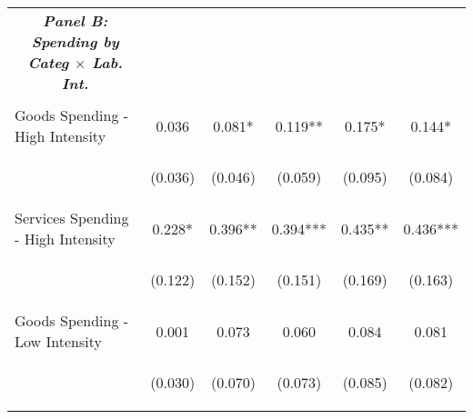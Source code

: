 \begin{tabular}{lccccc}
    \multicolumn{1}{c}{\textit{\textbf{Panel B: Spending by Categ $\times$ Lab. Int.}}} \\ 
    \vspace{-2pt} & \vspace{-2pt} & \vspace{-2pt} & \vspace{-2pt} \\
    
    Goods Spending - High Intensity & 0.036 & 0.081* & 0.119** & 0.175* & 0.144* \\
    & \begin{footnotesize}(0.036)\end{footnotesize} & \begin{footnotesize}(0.046)\end{footnotesize} & \begin{footnotesize}(0.059)\end{footnotesize} & \begin{footnotesize}(0.095)\end{footnotesize} & \begin{footnotesize}(0.084)\end{footnotesize} \\
    Services Spending - High Intensity & 0.228* & 0.396** & 0.394*** & 0.435** & 0.436*** \\
    & \begin{footnotesize}(0.122)\end{footnotesize} & \begin{footnotesize}(0.152)\end{footnotesize} & \begin{footnotesize}(0.151)\end{footnotesize} & \begin{footnotesize}(0.169)\end{footnotesize} & \begin{footnotesize}(0.163)\end{footnotesize} \\
    Goods Spending - Low Intensity & 0.001 & 0.073 & 0.060 & 0.084 & 0.081 \\
    & \begin{footnotesize}(0.030)\end{footnotesize} & \begin{footnotesize}(0.070)\end{footnotesize} & \begin{footnotesize}(0.073)\end{footnotesize} & \begin{footnotesize}(0.085)\end{footnotesize} & \begin{footnotesize}(0.082)\end{footnotesize} \\

\end{tabular}
